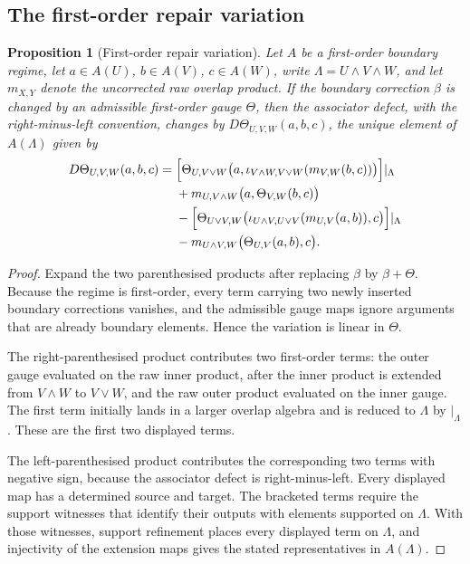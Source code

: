 \documentclass[11pt]{article}
\newtheorem{proposition}[theorem]{Proposition}
\begin{document}
\subsection{The first-order repair variation}

\begin{proposition}[First-order repair variation]
\label{prop:four-term}
Let \(A\) be a first-order boundary regime, let \(a\in A(U)\), \(b\in A(V)\), \(c\in A(W)\), write \(\Lambda=U\wedge V\wedge W\), and let \(m_{X,Y}\) denote the uncorrected raw overlap product. If the boundary correction \(\beta\) is changed by an admissible first-order gauge \(\Theta\), then the associator defect, with the right-minus-left convention, changes by \(D\Theta_{U,V,W}(a,b,c)\), the unique element of \(A(\Lambda)\) given by
\begin{align*}
D\Theta_{U,V,W}(a,b,c)
={}&
\Bigl[\Theta_{U,V\vee W}\bigl(a,\iota_{V\wedge W,V\vee W}(m_{V,W}(b,c))\bigr)\Bigr]\rvert_\Lambda \\
&+m_{U,V\wedge W}\bigl(a,\Theta_{V,W}(b,c)\bigr) \\
&-\Bigl[\Theta_{U\vee V,W}\bigl(\iota_{U\wedge V,U\vee V}(m_{U,V}(a,b)),c\bigr)\Bigr]\rvert_\Lambda \\
&-m_{U\wedge V,W}\bigl(\Theta_{U,V}(a,b),c\bigr).
\end{align*}
\end{proposition}

\begin{proof}
Expand the two parenthesised products after replacing \(\beta\) by \(\beta+\Theta\). Because the regime is first-order, every term carrying two newly inserted boundary corrections vanishes, and the admissible gauge maps ignore arguments that are already boundary elements. Hence the variation is linear in \(\Theta\).

The right-parenthesised product contributes two first-order terms: the outer gauge evaluated on the raw inner product, after the inner product is extended from \(V\wedge W\) to \(V\vee W\), and the raw outer product evaluated on the inner gauge. The first term initially lands in a larger overlap algebra and is reduced to \(\Lambda\) by \(\rvert_\Lambda\). These are the first two displayed terms.

The left-parenthesised product contributes the corresponding two terms with negative sign, because the associator defect is right-minus-left. Every displayed map has a determined source and target. The bracketed terms require the support witnesses that identify their outputs with elements supported on \(\Lambda\). With those witnesses, support refinement places every displayed term on \(\Lambda\), and injectivity of the extension maps gives the stated representatives in \(A(\Lambda)\).
\end{proof}
\end{document}
